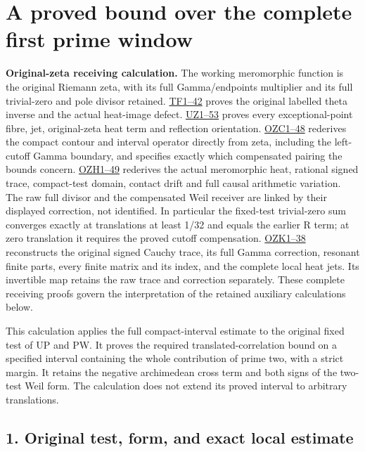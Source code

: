 \documentclass[
  10pt,
  a4paper,
]{article}
\author{}
\date{}
\begin{document}
{
\setcounter{tocdepth}{3}
\tableofcontents
}
\section{A proved bound over the complete first prime
window}\label{a-proved-bound-over-the-complete-first-prime-window}

\textbf{Original-zeta receiving calculation.} The working meromorphic
function is the original Riemann zeta, with its full Gamma/endpoints
multiplier and its full trivial-zero and pole divisor retained.
\href{FAITHFUL_THETA_COMPLETION_RETURN.md}{TF1--42} proves the original
labelled theta inverse and the actual heat-image defect.
\href{FAITHFUL_UNCOMPLETED_ZETA_HEAT.md}{UZ1--53} proves every
exceptional-point fibre, jet, original-zeta heat term and reflection
orientation.
\href{ORIGINAL_ZETA_COMPACT_WEIL_RECONSTRUCTION.md}{OZC1--48} rederives
the compact contour and interval operator directly from zeta, including
the left-cutoff Gamma boundary, and specifies exactly which compensated
pairing the bounds concern.
\href{ORIGINAL_ZETA_HEAT_CONTACT_RECONSTRUCTION.md}{OZH1--49} rederives
the actual meromorphic heat, rational signed trace, compact-test domain,
contact drift and full causal arithmetic variation. The raw full divisor
and the compensated Weil receiver are linked by their displayed
correction, not identified. In particular the fixed-test trivial-zero
sum converges exactly at translations at least 1/32 and equals the
earlier R term; at zero translation it requires the proved cutoff
compensation. \href{ORIGINAL_ZETA_CAUCHY_RECONSTRUCTION.md}{OZK1--38}
reconstructs the original signed Cauchy trace, its full Gamma
correction, resonant finite parts, every finite matrix and its index,
and the complete local heat jets. Its invertible map retains the raw
trace and correction separately. These complete receiving proofs govern
the interpretation of the retained auxiliary calculations below.

This calculation applies the full compact-interval estimate to the
original fixed test of UP and PW. It proves the required
translated-correlation bound on a specified interval containing the
whole contribution of prime two, with a strict margin. It retains the
negative archimedean cross term and both signs of the two-test Weil
form. The calculation does not extend its proved interval to arbitrary
translations.

\subsection{1. Original test, form, and exact local
estimate}\label{original-test-form-and-exact-local-estimate}
\end{document}
